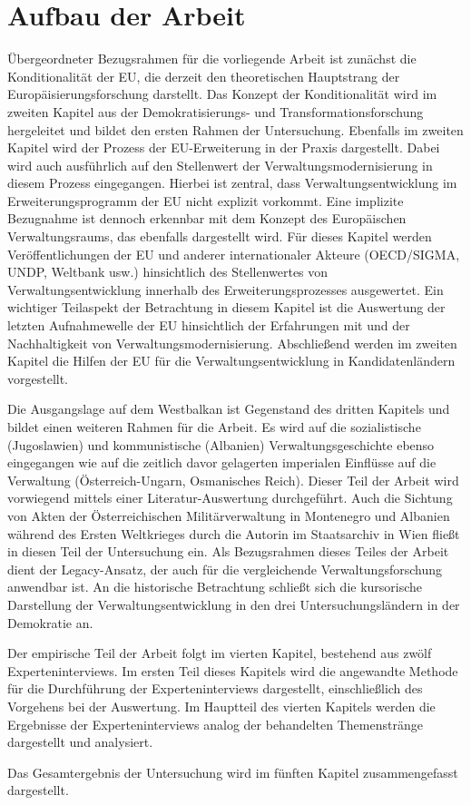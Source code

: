 \section{Aufbau der Arbeit }
Übergeordneter Bezugsrahmen für die vorliegende Arbeit ist zunächst die Konditionalität der EU, die derzeit den theoretischen Hauptstrang der Europäisierungsforschung darstellt. Das Konzept der Konditionalität wird im zweiten Kapitel aus der Demokratisierungs- und Transformationsforschung hergeleitet und bildet den ersten Rahmen der Untersuchung.
Ebenfalls im zweiten Kapitel wird der Prozess der EU-Erweiterung in der Praxis dargestellt. Dabei wird auch ausführlich auf den Stellenwert der Verwaltungsmodernisierung in diesem Prozess eingegangen. Hierbei ist zentral, dass Verwaltungsentwicklung im Erweiterungsprogramm der EU nicht explizit vorkommt. Eine implizite Bezugnahme ist dennoch erkennbar mit dem Konzept des Europäischen Verwaltungsraums, das ebenfalls dargestellt wird. Für dieses Kapitel werden Veröffentlichungen der EU und anderer internationaler Akteure (OECD/SIGMA, UNDP, Weltbank usw.) hinsichtlich des Stellenwertes von Verwaltungsentwicklung innerhalb des Erweiterungsprozesses ausgewertet. Ein wichtiger Teilaspekt der Betrachtung in diesem Kapitel ist die Auswertung der letzten Aufnahmewelle der EU hinsichtlich der Erfahrungen mit und der Nachhaltigkeit von Verwaltungsmodernisierung. Abschließend werden im zweiten Kapitel die Hilfen der EU für die Verwaltungsentwicklung in Kandidatenländern vorgestellt. \par
Die Ausgangslage auf dem Westbalkan ist Gegenstand des dritten Kapitels und bildet einen weiteren Rahmen für die Arbeit. Es wird auf die sozialistische (Jugoslawien) und kommunistische (Albanien) Verwaltungsgeschichte ebenso eingegangen wie auf die zeitlich davor gelagerten imperialen Einflüsse auf die Verwaltung (Österreich-Ungarn, Osmanisches Reich). Dieser Teil der Arbeit wird vorwiegend mittels einer Literatur-Auswertung durchgeführt. Auch die Sichtung von Akten der Österreichischen Militärverwaltung in Montenegro und Albanien während des Ersten Weltkrieges durch die Autorin im Staatsarchiv in Wien fließt in diesen Teil der Untersuchung ein. Als Bezugsrahmen dieses Teiles der Arbeit dient der Legacy-Ansatz, der auch für die vergleichende Verwaltungsforschung anwendbar ist. An die historische Betrachtung schließt sich die kursorische Darstellung der Verwaltungsentwicklung in den drei Untersuchungsländern in der Demokratie an.\par
Der empirische Teil der Arbeit folgt im vierten Kapitel, bestehend aus zwölf Experteninterviews. Im ersten Teil dieses Kapitels wird die angewandte Methode für die Durchführung der Experteninterviews dargestellt, einschließlich des Vorgehens bei der Auswertung. Im Hauptteil des vierten Kapitels werden die Ergebnisse der Experteninterviews analog der behandelten Themenstränge dargestellt und analysiert.\par
Das Gesamtergebnis der Untersuchung wird im fünften Kapitel zusammengefasst dargestellt.